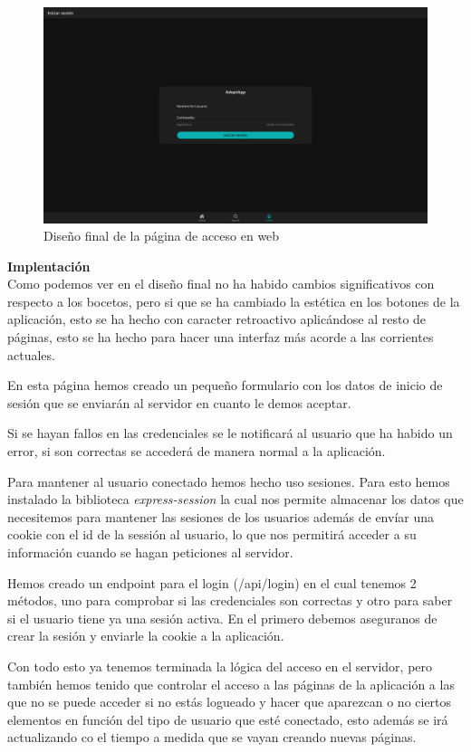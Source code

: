 \begin{figure}[H]
	\centering
	\includegraphics[width=0.7\linewidth]{"sprint 2/hu6/ImpLoginWeb"}
	\caption{Diseño final de la página de acceso en web}
	\label{fig:imploginweb}
\end{figure}

\textbf{Implentación} \\

Como podemos ver en el diseño final no ha habido cambios significativos con respecto a los bocetos, pero si que se ha cambiado la estética en los botones de la aplicación, esto se ha hecho con caracter retroactivo aplicándose al resto de páginas, esto se ha hecho para hacer una interfaz más acorde a las corrientes actuales.

En esta página hemos creado un pequeño formulario con los datos de inicio de sesión que se enviarán al servidor en cuanto le demos aceptar.

Si se hayan fallos en las credenciales se le notificará al usuario que ha habido un error, si son correctas se accederá de manera normal a la aplicación.

Para mantener al usuario conectado hemos hecho uso sesiones. Para esto hemos instalado la biblioteca \textit{express-session} la cual nos permite almacenar los datos que necesitemos para mantener las sesiones de los usuarios además de envíar una cookie con el id de la sessión al usuario, lo que nos permitirá acceder a su información cuando se hagan peticiones al servidor.

Hemos creado un endpoint para el login (/api/login) en el cual tenemos 2 métodos, uno para comprobar si las credenciales son correctas y otro para saber si el usuario tiene ya una sesión activa. En el primero debemos aseguranos de crear la sesión y enviarle la cookie a la aplicación.

Con todo esto ya tenemos terminada la lógica del acceso en el servidor, pero también hemos tenido que controlar el acceso a las páginas de la aplicación a las que no se puede acceder si no estás logueado y hacer que aparezcan o no ciertos elementos en función del tipo de usuario que esté conectado, esto además se irá actualizando co el tiempo a medida que se vayan creando nuevas páginas. \\

